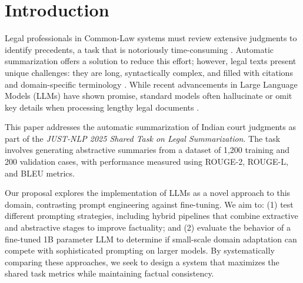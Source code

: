 \documentclass[sigconf]{acmart}
\begin{document}


\maketitle

\section{Introduction}

Legal professionals in Common-Law systems must review extensive judgments to identify precedents, a task that is notoriously time-consuming \citep{shukla2022legal}. Automatic summarization offers a solution to reduce this effort; however, legal texts present unique challenges: they are long, syntactically complex, and filled with citations and domain-specific terminology \citep{sharma2023comprehensive}. While recent advancements in Large Language Models (LLMs) have shown promise, standard models often hallucinate or omit key details when processing lengthy legal documents \citep{deroy2024applicability}.

This paper addresses the automatic summarization of Indian court judgments as part of the \textit{JUST-NLP 2025 Shared Task on Legal Summarization}. The task involves generating abstractive summaries from a dataset of 1,200 training and 200 validation cases, with performance measured using ROUGE-2, ROUGE-L, and BLEU metrics.

Our proposal explores the implementation of LLMs as a novel approach to this domain, contrasting prompt engineering against fine-tuning. We aim to: (1) test different prompting strategies, including hybrid pipelines that combine extractive and abstractive stages to improve factuality; and (2) evaluate the behavior of a fine-tuned 1B parameter LLM to determine if small-scale domain adaptation can compete with sophisticated prompting on larger models. By systematically comparing these approaches, we seek to design a system that maximizes the shared task metrics while maintaining factual consistency.
\end{document}
